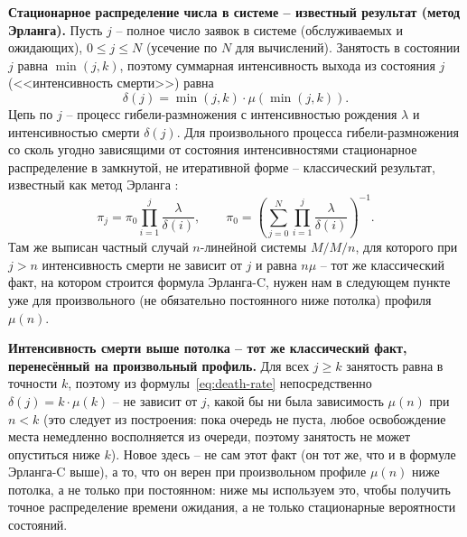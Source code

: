 \documentclass[12pt,a4paper]{article}
\begin{document}
\noindent\textbf{Стационарное распределение числа в системе -- известный результат (метод Эрланга).} Пусть $j$ -- полное число заявок в системе (обслуживаемых и ожидающих), $0\le j\le N$ (усечение по $N$ для вычислений). Занятость в состоянии $j$ равна $\min(j,k)$, поэтому суммарная интенсивность выхода из состояния $j$ (<<интенсивность смерти>>) равна
\begin{equation}
\delta(j) = \min(j,k)\cdot\mu(\min(j,k)).
\label{eq:death-rate}
\end{equation}
Цепь по $j$ -- процесс гибели-размножения с интенсивностью рождения $\lambda$ и интенсивностью смерти $\delta(j)$. Для произвольного процесса гибели-размножения со сколь угодно зависящими от состояния интенсивностями стационарное распределение в замкнутой, не итеративной форме -- классический результат, известный как метод Эрланга \cite{ryzhikov2018}:
\begin{equation}
\pi_j = \pi_0\prod_{i=1}^{j}\frac{\lambda}{\delta(i)}, \qquad \pi_0 = \left(\sum_{j=0}^{N}\prod_{i=1}^{j}\frac{\lambda}{\delta(i)}\right)^{-1}.
\label{eq:pi-product-form}
\end{equation}
Там же выписан частный случай $n$-линейной системы $M/M/n$, для которого при $j>n$ интенсивность смерти не зависит от $j$ и равна $n\mu$ -- тот же классический факт, на котором строится формула Эрланга-C, нужен нам в следующем пункте уже для произвольного (не обязательно постоянного ниже потолка) профиля $\mu(n)$.

\noindent\textbf{Интенсивность смерти выше потолка -- тот же классический факт, перенесённый на произвольный профиль.} Для всех $j\ge k$ занятость равна в точности $k$, поэтому из формулы~\eqref{eq:death-rate} непосредственно $\delta(j)=k\cdot\mu(k)$ -- не зависит от $j$, какой бы ни была зависимость $\mu(n)$ при $n<k$ (это следует из построения: пока очередь не пуста, любое освобождение места немедленно восполняется из очереди, поэтому занятость не может опуститься ниже $k$). Новое здесь -- не сам этот факт (он тот же, что и в формуле Эрланга-C выше), а то, что он верен при произвольном профиле $\mu(n)$ ниже потолка, а не только при постоянном: ниже мы используем это, чтобы получить точное распределение времени ожидания, а не только стационарные вероятности состояний.
\end{document}
